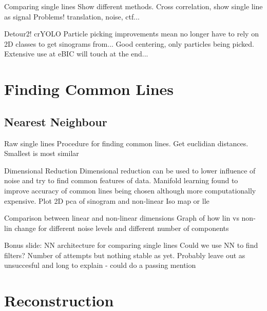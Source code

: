 \documentclass[t, 11pt]{beamer}
\begin{document}
\begin{frame}[fragile]{Comparing single lines}
  Show different methods.
  Cross correlation,
  show single line as signal
  Problems! translation, noise, ctf...
\end{frame}

\begin{frame}[fragile]{Detour2! crYOLO}
  Particle picking improvements mean no longer have to rely on 2D classes to get sinograms from...
  Good centering, only particles being picked.
  Extensive use at eBIC will touch at the end...
\end{frame}


\section{Finding Common Lines}
\subsection*{Nearest Neighbour}

\begin{frame}[fragile]{Raw single lines}
  Procedure for finding common lines. Get euclidian distances. Smallest is most similar
\end{frame}

\begin{frame}[fragile]{Dimensional Reduction}
  Dimensional reduction can be used to lower influence of noise and try to find common features of data.
  Manifold learning found to improve accuracy of common lines being chosen although more computationally expensive.
  Plot 2D pca of sinogram
  and non-linear Iso map or lle
\end{frame}

\begin{frame}[fragile]{Comparison between linear and non-linear dimensions}
  Graph of how lin vs non-lin change for different noise levels and different number of components
\end{frame}

\begin{frame}[fragile]{Bonus slide: NN architecture for comparing single lines}
  Could we use NN to find filters? Number of attempts but nothing stable as yet.
  Probably leave out as unsuccesful and long to explain - could do a passing mention
\end{frame}

\section{Reconstruction}
\end{document}
